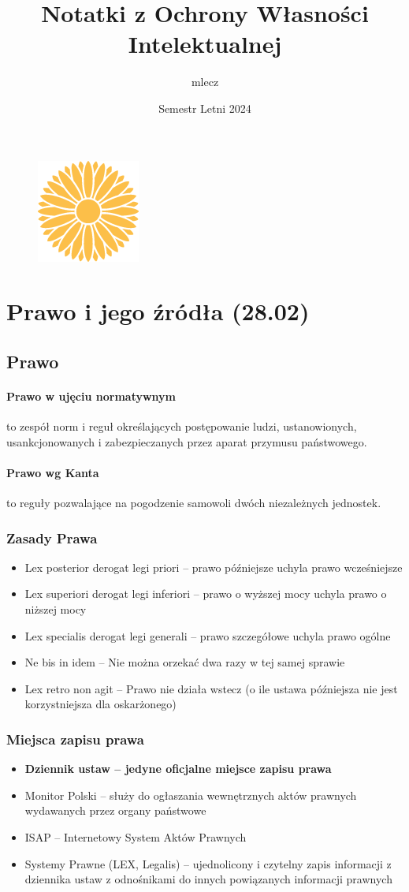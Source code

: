 \documentclass{article}
\title{Notatki z Ochrony Własności Intelektualnej}
\author{mlecz}
\date{Semestr Letni 2024}
\newcommand{\watermark}{
  \begin{figure}[b]
    \transparent{0.4} \includegraphics*[]{mlecz}
    \centering
  \end{figure}
}
\begin{document}
\maketitle
\tableofcontents
\watermark

\newpage
\section{Prawo i jego źródła (28.02)}

\subsection{Prawo}

\paragraph{Prawo w ujęciu normatywnym}
to zespół norm i reguł określających postępowanie ludzi, ustanowionych, usankcjonowanych i zabezpieczanych przez aparat przymusu państwowego.

\paragraph{Prawo wg Kanta}
to reguły pozwalające na pogodzenie samowoli dwóch niezależnych jednostek.

\subsubsection{Zasady Prawa}
\begin{itemize}
  \item Lex posterior derogat legi priori -- prawo późniejsze uchyla prawo wcześniejsze
  \item Lex superiori derogat legi inferiori -- prawo o wyższej mocy uchyla prawo o niższej mocy
  \item Lex specialis derogat legi generali -- prawo szczegółowe uchyla prawo ogólne
  \item Ne bis in idem -- Nie można orzekać dwa razy w tej samej sprawie
  \item Lex retro non agit -- Prawo nie działa wstecz (o ile ustawa późniejsza nie jest
        korzystniejsza dla oskarżonego)
\end{itemize}

\subsubsection{Miejsca zapisu prawa}
\begin{itemize}
  \item \textbf{Dziennik ustaw -- jedyne oficjalne miejsce zapisu prawa}
  \item Monitor Polski -- służy do ogłaszania wewnętrznych aktów prawnych wydawanych
        przez organy państwowe
  \item ISAP -- Internetowy System Aktów Prawnych
  \item Systemy Prawne (LEX, Legalis) -- ujednolicony i czytelny zapis informacji
        z dziennika ustaw z odnośnikami do innych powiązanych informacji prawnych
\end{itemize}
\end{document}
